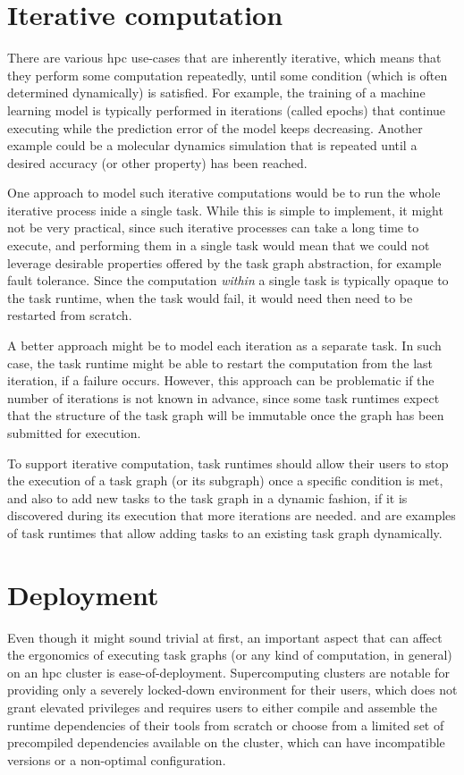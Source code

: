 \section{Iterative computation}
There are various \gls{hpc} use-cases that are inherently iterative, which means
that they perform some computation repeatedly, until some condition (which is often determined
dynamically) is satisfied. For example, the training of a machine learning model is typically
performed in iterations (called epochs) that continue executing while the prediction error of the
model keeps decreasing. Another example could be a molecular dynamics simulation that is repeated
until a desired accuracy (or other property) has been reached.

One approach to model such iterative computations would be to run the whole iterative process inide
a single task. While this is simple to implement, it might not be very practical, since such
iterative processes can take a long time to execute, and performing them in a single task would
mean that we could not leverage desirable properties offered by the task graph abstraction, for
example fault tolerance. Since the computation \emph{within} a single task is
typically opaque to the task runtime, when the task would fail, it would need then need to be
restarted from scratch.

A better approach might be to model each iteration as a separate task. In such case, the task
runtime might be able to restart the computation from the last iteration, if a failure occurs.
However, this approach can be problematic if the number of iterations is not known in advance,
since some task runtimes expect that the structure of the task graph will be immutable once the
graph has been submitted for execution.

To support iterative computation, task runtimes should allow their users to stop the execution of a
task graph (or its subgraph) once a specific condition is met, and also to add new tasks to the
task graph in a dynamic fashion, if it is discovered during its execution that more iterations are
needed. \dask{} and \ray{} are examples of task runtimes
that allow adding tasks to an existing task graph dynamically.

\section{Deployment}
\label{challenge:deployment}
Even though it might sound trivial at first, an important aspect that can affect the ergonomics of
executing task graphs (or any kind of computation, in general) on an \gls{hpc}
cluster is ease-of-deployment. Supercomputing clusters are notable for providing only a severely
locked-down environment for their users, which does not grant elevated privileges and requires
users to either compile and assemble the runtime dependencies of their tools from scratch or choose
from a limited set of precompiled dependencies available on the cluster, which can have
incompatible versions or a non-optimal configuration.

